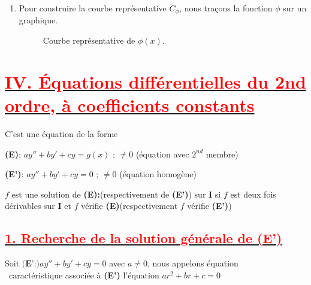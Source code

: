 \documentclass{article}
\begin{document}
\begin{enumerate}
    \item
    Pour construire la courbe représentative $C_{\phi}$, nous traçons la fonction $\phi$ sur un graphique.

    \begin{figure}[h!]
        \centering
        \caption{Courbe représentative de $\phi(x)$.}
    \end{figure}
    
\end{enumerate}
\section*{\underline{\textbf{\textcolor{red}{IV. Équations différentielles du 2nd ordre, à coefficients constants}}}}
C'est une équation de la forme

\textbf{(E)}: $ay''+by'+cy=g(x)$ ; $\neq 0$ (équation avec $2^{nd}$ membre)

\textbf{(E')}: $ay''+by'+cy=0$ ; $\neq 0$ (équation homogène)

$f$ est une solution de \textbf{(E):}(respectivement de \textbf{(E')}) sur \textbf{I} si $f$ est deux fois dérivables sur \textbf{I}  et $f$ vérifie \textbf{(E)}(respectivement $f$ vérifie \textbf{(E')})
\subsection*{\underline{\textbf{\textcolor{red}{1. Recherche de la solution générale de (E')}}}}
Soit $\textbf{(E':)}ay''+by'+cy=0$ avec $a\neq 0$, nous appelons équation\\\ caractéristique associée à \textbf{(E')} l'équation $ar^{2}+br+c=0$
\end{document}
